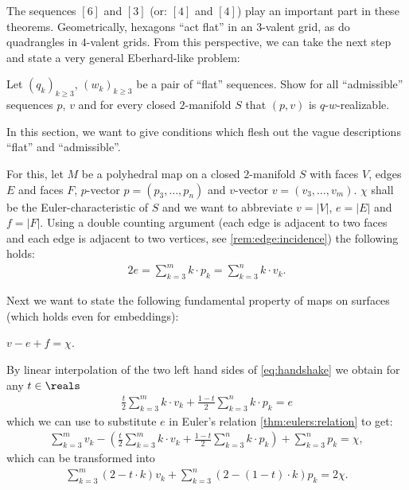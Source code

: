 The sequences $[6]$ and $[3]$ (or: $[4]$ and $[4]$) play an important part in these theorems. Geometrically, hexagons ``act flat'' in an $3$-valent grid, as do quadrangles in $4$-valent grids. From this perspective, we can take the next step and state a very general {\sc Eberhard}-like problem:

\begin{problem}\label{prob:eberhard:unspecified}
  Let $(q_k)_{k \geq 3}$, $(w_k)_{k \geq 3}$ be a pair of ``flat'' sequences. Show for all ``admissible'' sequences $p$, $v$ and for every closed $2$-manifold $S$ that $(p, v)$ is $q$-$w$-realizable.
\end{problem}

In this section, we want to give conditions which flesh out the vague descriptions ``flat'' and ``admissible''. 

For this, let $M$ be a polyhedral map on a closed $2$-manifold $S$ with faces $V$, edges $E$ and faces $F$, $p$-vector $p = (p_3, \dots, p_n)$ and $v$-vector $v = (v_3, \dots, v_m)$. $\chi$ shall be the {\sc Euler}-characteristic of $S$ and we want to abbreviate $v = |V|$, $e = |E|$ and $f = |F|$. Using a double counting argument (each edge is adjacent to two faces and each edge is adjacent to two vertices, see \autoref{rem:edge:incidence}) the following holds:
\begin{align}
  2e = \sum_{k=3}^{m} k \cdot p_k = \sum_{k=3}^{n} k \cdot v_k \label{eq:handshake}.
\end{align}

Next we want to state the following fundamental property of maps on surfaces (which holds even for embeddings):
\begin{theorem}\label{thm:eulers:relation} $v - e + f = \chi$.
\end{theorem}

By linear interpolation of the two left hand sides of \eqref{eq:handshake} we obtain for any $t \in \reals$
\begin{align}
  \frac{t}{2} \sum_{k=3}^m k \cdot v_k + \frac{1-t}{2} \sum_{k=3}^n k \cdot p_k = e \label{eq:interpolated:handshake}
\end{align}
 which we can use to substitute $e$ in Euler's relation \autoref{thm:eulers:relation} to get:
\begin{align*}
  \sum_{k=3}^m v_k - \left(\frac{t}{2} \sum_{k=3}^m k \cdot v_k + \frac{1-t}{2} \sum_{k=3}^n k \cdot p_k \right) + \sum_{k=3}^n p_k = \chi,
\end{align*}
which can be transformed into
\begin{align}
  \sum_{k=3}^m (2 - t \cdot k ) v_k + \sum_{k=3}^n ( 2 - (1 - t) \cdot k ) p_k = 2 \chi. \label{eq:general:vp:relation}
\end{align}

